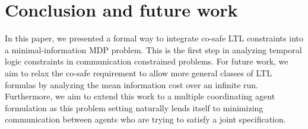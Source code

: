 \documentclass[letterpaper, 10 pt, conference]{ieeeconf}  %
\begin{document}
\section{Conclusion and future work}
In this paper, we presented a formal way to integrate co-safe LTL constraints into a minimal-information MDP problem. This is the first step in analyzing temporal logic constraints in communication constrained problems. For future work, we aim to relax the co-safe requirement to allow more general classes of LTL formulas by analyzing the mean information cost over an infinite run. Furthermore, we aim to extend this work to a multiple coordinating agent formulation as this problem setting naturally lends itself to minimizing communication between agents who are trying to satisfy a joint specification. 






\appendices
\vspace{-0.15cm}
%
\end{document}
